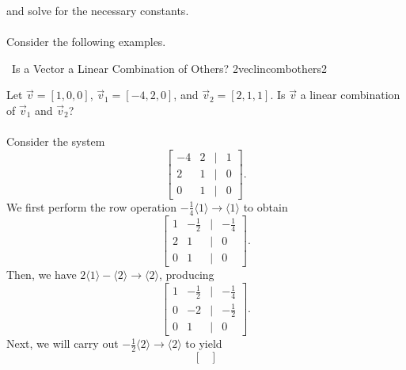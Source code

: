         and solve for the necessary constants.
        \pagebreak
        \\
        \\
        Consider the following examples.
        \begin{example}{\Difficulty\,\Difficulty\,\,Is a Vector a Linear Combination of Others? 2}{veclincombothers2}
        
            Let \(\vec{v}=[1,0,0]\), \(\vec{v}_1=[-4,2,0]\), and \(\vec{v}_2=[2,1,1]\). Is \(\vec{v}\) a linear combination of \(\vec{v}_1\) and \(\vec{v}_2\)?
            \\
            \\
            Consider the system
            \begin{equation*}
                \begin{bmatrix}
                    -4 & 2 & | & 1 \\
                    2 & 1 & | & 0 \\
                    0 & 1 & | & 0
                \end{bmatrix}.
            \end{equation*}
            We first perform the row operation \(-\frac{1}{4}\langle1\rangle\to\langle1\rangle\) to obtain
            \begin{equation*}
                \begin{bmatrix}
                    1 & -\frac{1}{2} & | & -\frac{1}{4} \\
                    2 & 1 & | & 0 \\
                    0 & 1 & | & 0
                \end{bmatrix}.
            \end{equation*}
            Then, we have \(2\langle1\rangle-\langle2\rangle\to\langle2\rangle\), producing
            \begin{equation*}
                \begin{bmatrix}
                    1 & -\frac{1}{2} & | & -\frac{1}{4} \\
                    0 & -2 & | & -\frac{1}{2} \\
                    0 & 1 & | & 0
                \end{bmatrix}.
            \end{equation*}
            Next, we will carry out \(-\frac{1}{2}\langle2\rangle\to\langle2\rangle\) to yield
            \begin{equation*}
                \begin{bmatrix}

\end{bmatrix}
\end{equation*}
\end{example}
